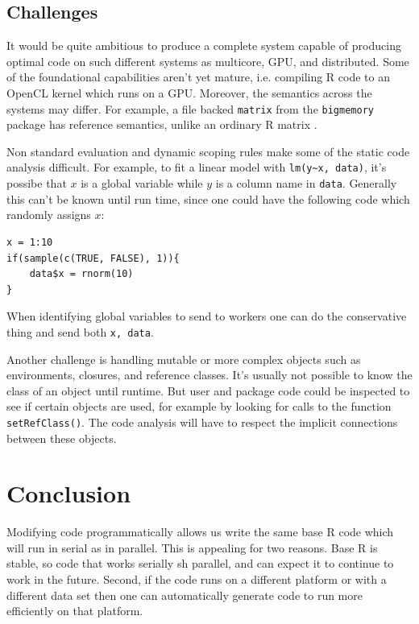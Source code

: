 \documentclass[12pt]{article}
\begin{document}
\subsection{Challenges}

It would be quite ambitious to produce a complete system capable of
producing optimal code on such different systems as multicore, GPU, and
distributed. Some of the foundational capabilities aren't yet mature, i.e.
compiling R code to an OpenCL kernel which runs on a GPU. Moreover, the
semantics across the systems may differ. For example, a file backed
\texttt{matrix} from the \texttt{bigmemory} package has reference
semantics, unlike an ordinary R matrix \cite{bigmemory}.

Non standard evaluation and dynamic scoping rules make some of the
static code analysis difficult. For example, to fit a linear model with
\texttt{lm(y\textasciitilde x, data)}, it's possibe that $x$ is a global variable while
$y$ is a column name in \texttt{data}. Generally this can't be known until
run time, since one could have the following code which randomly assigns
$x$:

\begin{verbatim}
x = 1:10
if(sample(c(TRUE, FALSE), 1)){
    data$x = rnorm(10)
}
\end{verbatim}

When identifying global variables to send to workers one can do the
conservative thing and send both \texttt{x, data}.

Another challenge is handling mutable or more complex objects
such as environments, closures, and reference classes.  It's usually not
possible to know the class of an object until runtime. But user and package
code could be inspected to see if certain objects are used, for example by
looking for calls to the function \texttt{setRefClass()}. The code
analysis will have to respect the implicit connections between these
objects.

\section{Conclusion}

Modifying code programmatically allows us write the same base R code
which will run in serial as in parallel. 
This is appealing for two
reasons. Base R is stable, so code that works serially sh
parallel, and can expect it to continue to work in the future. Second, if
the code runs on a different platform or with a different data set then one
can automatically generate code to run more efficiently on that platform.
\end{document}

